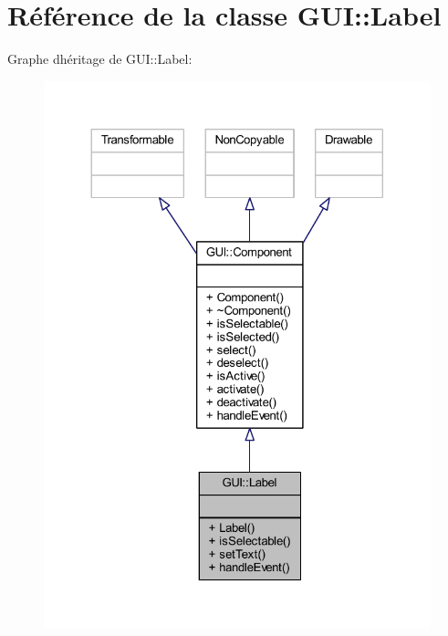 \hypertarget{class_g_u_i_1_1_label}{}\section{Référence de la classe G\+UI\+:\+:Label}
\label{class_g_u_i_1_1_label}


Graphe d\textquotesingle{}héritage de G\+UI\+:\+:Label\+:\nopagebreak
\begin{figure}[H]
\begin{center}
\leavevmode
\includegraphics[width=324pt]{class_g_u_i_1_1_label__inherit__graph}
\end{center}
\end{figure}


